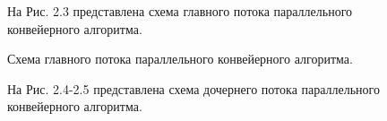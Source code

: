 \documentclass[12pt]{report}
\begin{document}
\clearpage

\begin{figure}[h]
На Рис. 2.3 представлена схема главного потока параллельного конвейерного алгоритма.
\end{figure}

\begin{figure}[h!]
	\caption{Схема главного потока параллельного конвейерного алгоритма.}
	\label{figure:image}
\end{figure}

\clearpage

\begin{figure}[h!]
	На Рис. 2.4-2.5 представлена схема дочернего потока параллельного конвейерного алгоритма.
\end{figure}
\end{document}
